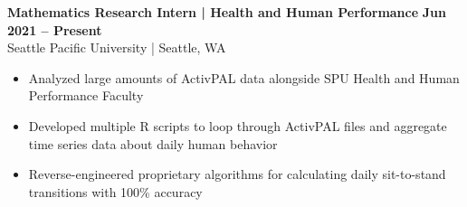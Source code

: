 \textbf{Mathematics Research Intern | Health and Human Performance} \hfill \textbf{Jun 2021 -- Present}\\
    Seattle Pacific University | Seattle, WA
    \squish
    \begin{itemize}
        \item Analyzed large amounts of ActivPAL data alongside SPU Health and Human Performance Faculty
        \item Developed multiple R scripts to loop through ActivPAL files and aggregate time series data about daily human behavior
        \item Reverse-engineered proprietary algorithms for calculating daily sit-to-stand transitions with 100\% accuracy
    \end{itemize}